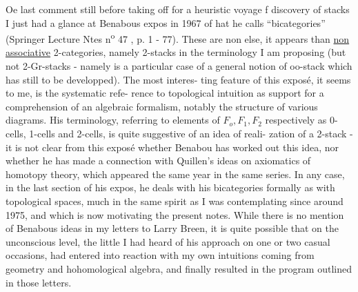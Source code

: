 Oe last comment still before taking off for a heuristic voyage
f discovery of stacks\hand{!} I just had a glance at Benabous expos in 1967
of hat he calls ``bicategories''  (Springer Lecture Ntes n\textsuperscript{o} 47 ,  p. 1
- 77).  These are non else,  it appears\hand{,}  than \deleted{(}\uline{non associative}
2-categories,  namely 2-stacks  in the terminology I am proposing
(but not 2-Gr-stacks  -  namely  is a particular case of a general
notion of oo-stack which  has still to be developped).  The most interes-%
\hand{-}ting feature of this exposé,  it seems to me,  is the systematic refe-%
rence to topological intuition as  support for a comprehension of an
algebraic formalism,  notably  the structure of various diagrams. His
terminology,  referring to elements of $F_o,F_1,F_2$ respectively as 0-cells,
1-cells and 2-cells,  is quite suggestive of an idea of   reali-%
zation of a 2-stack  -  it is not clear from this exposé whether Benabou
has worked out this idea,  nor whether he has made a connection with
Quillen's ideas on axiomatics of homotopy theory,  which appeared the
same year in the same series. In any case,  in the last section of his
expos,  he deals with his bicategories formally as with topological
spaces,  much in the same spirit as \hand{(} I was contemplating since 
around 1975,  and which is now motivating the present notes.  While
there is no mention of Benabous ideas in my letters to Larry Breen,
it is quite possible that on the unconscious level,  the little I had
heard of his approach on one or two casual occasions,  had entered into
reaction with my own intuitions\hand{,} coming  from geometry and hohomological
algebra,  and finally resulted in the program outlined in those letters.
